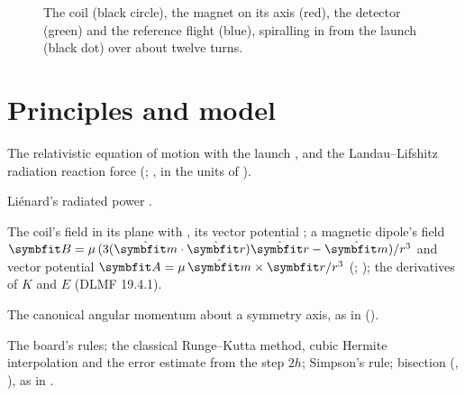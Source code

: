\documentclass{leveldoc}
\begin{document}
\begin{figure}[htbp]
\centering
{}
\caption{The coil (black circle), the magnet on its axis (red), the detector (green) and the
reference flight (blue), spiralling in from the launch (black dot) over about twelve turns.}
\label{fig:board}
\end{figure}

\section{Principles and model}\label{sec:model}

\begin{principles}
  \item The relativistic equation of motion  with the launch
    , and the Landau--Lifshitz radiation reaction force
    (; , in the units of ).
  \item Liénard's radiated power .
  \item The coil's field in its plane  with
    , its vector potential ;
    a magnetic dipole's field $\vect{B} = \mu\,(3(\uvec{m}\cdot\uvec{r})\uvec{r} - \uvec{m})/r^3$
    and vector potential $\vect{A} = \mu\,\uvec{m}\times\vect{r}/r^3$ (;
    ); the derivatives of $K$ and $E$ (DLMF 19.4.1).
  \item The canonical angular momentum about a symmetry axis, as in
     ().
  \item The board's rules; the classical Runge--Kutta method, cubic Hermite interpolation and the
    error estimate from the step $2h$; Simpson's rule; bisection
    (, ), as in
    .
\end{principles}
\end{document}
